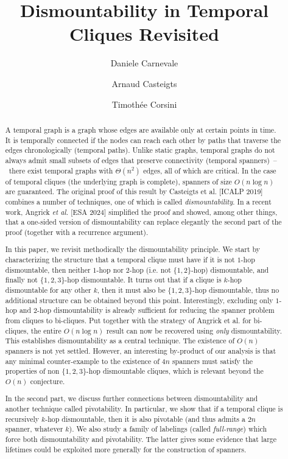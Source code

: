 \documentclass[USenglish, a4paper, thm-restate,numberwithinsect, cleveref]{lipics-v2021}
\title{Dismountability in Temporal Cliques Revisited}
\author{Daniele Carnevale}{Gran Sasso Science Institute, L'Aquila, Italy}{}{}{}
\author{Arnaud Casteigts}{University of Geneva, Switzerland}{}{}{}
\author{Timothée Corsini}{LaBRI, University of Bordeaux, France}{}{}{}
\begin{document}
\maketitle

\begin{abstract}
  A temporal graph is a graph whose edges are available only at certain points in time. It is temporally connected if the nodes can reach each other by paths that traverse the edges chronologically (temporal paths).
  Unlike static graphs, temporal graphs do not always admit small subsets of edges that preserve connectivity (temporal spanners)~--~there exist temporal graphs with $\Theta(n^2)$ edges, all of which are critical. In the case of temporal cliques (the underlying graph is complete), spanners of size $O(n\log n)$ are guaranteed. The original proof of this result by Casteigts et al. [ICALP 2019] combines a number of techniques, one of which is called \emph{dismountability}. In a recent work, Angrick \textit{et al.} [ESA 2024] simplified the proof and showed, among other things, that a one-sided version of dismountability can replace elegantly the second part of the proof (together with a recurrence argument).

  In this paper, we revisit methodically the dismountability principle. We start by characterizing the structure that a temporal clique must have if it is not $1$-hop dismountable, then neither $1$-hop nor $2$-hop (i.e. not $\{1,2\}$-hop) dismountable, and finally not $\{1,2,3\}$-hop dismountable.
  It turns out that if a clique is $k$-hop dismountable for any other $k$, then it must also be $\{1,2,3\}$-hop dismountable, thus no additional structure can be obtained beyond this point. Interestingly, excluding only $1$-hop and $2$-hop dismountability is already sufficient for reducing the spanner problem from cliques to bi-cliques. Put together with the strategy of Angrick et al. for bi-cliques, the entire $O(n \log n)$ result can now be recovered using \emph{only} dismountability. This establishes dismountability as a central technique. The existence of $O(n)$ spanners is not yet settled. However, an interesting by-product of our analysis is that any minimal counter-example to the existence of $4n$ spanners must satisfy the properties of non $\{1,2,3\}$-hop dismountable cliques, which is relevant beyond the $O(n)$ conjecture.

  In the second part, we discuss further connections between dismountability and another technique called pivotability. In particular, we show that if a temporal clique is recursively $k$-hop dismountable, then it is also pivotable (and thus admits a $2n$ spanner, whatever $k$). We also study a family of labelings (called \emph{full-range}) which force both dismountability and pivotability. The latter gives some evidence that large lifetimes could be exploited more generally for the construction of spanners.
\end{abstract}
\end{document}
